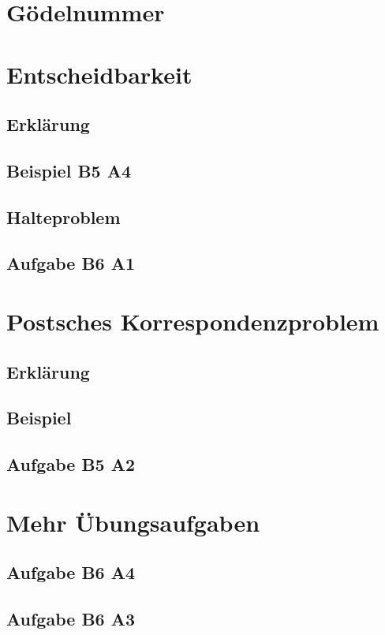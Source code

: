


\section{Gödelnummer}

\section{Entscheidbarkeit}
\subsection{Erklärung}
\subsection{Beispiel B5 A4}
\subsection{Halteproblem}
\subsection{Aufgabe B6 A1}

\section{Postsches Korrespondenzproblem}
\subsection{Erklärung}
\subsection{Beispiel}
\subsection{Aufgabe B5 A2}

\section{Mehr Übungsaufgaben}
\subsection{Aufgabe B6 A4}
\subsection{Aufgabe B6 A3}

